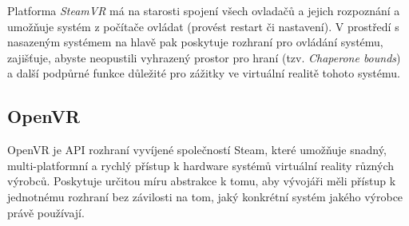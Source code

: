 Platforma \emph{SteamVR} má na starosti spojení všech ovladačů a jejich
rozpoznání a umožňuje systém z počítače ovládat (provést restart či
nastavení). V prostředí s nasazeným systémem na hlavě pak poskytuje
rozhraní pro ovládání systému, zajišťuje, abyste neopustili vyhrazený
prostor pro hraní (tzv. \emph{Chaperone bounds}) a další podpůrné funkce
důležité pro zážitky ve virtuální realitě tohoto systému.

\subsection{OpenVR}\label{openvr}

OpenVR je API rozhraní vyvíjené společností Steam, které umožňuje
snadný, multi-platformní a rychlý přístup k hardware systémů virtuální
reality různých výrobců. Poskytuje určitou míru abstrakce k tomu, aby
vývojáři měli přístup k jednotnému rozhraní bez závilosti na tom, jaký
konkrétní systém jakého výrobce právě používají.
